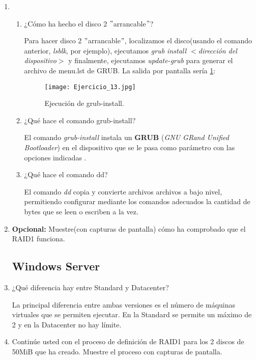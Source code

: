 \documentclass[paper=a4, fontsize=11pt]{scrartcl} %
\numberwithin{equation}{section} %
\numberwithin{figure}{section} %
\numberwithin{table}{section} %
\begin{document}
\begin{enumerate}
		
		\item \begin{enumerate}
			\item ¿Cómo ha hecho el disco 2 $"$arrancable$"$?
			
			Para hacer disco 2 $"$arrancable$"$, localizamos el disco(usando el comando anterior,
			\textit{lsblk}, por ejemplo), ejecutamos \textit{grub install $<$dirección del dispositivo$>$}
			y finalmente, ejecutamos \textit{update-grub} para generar el archivo de menu.lst de GRUB.
			La salida por pantalla sería \ref{fig:grub}:

			\begin{figure}[H]
				\centering
				\texttt{[image: Ejercicio\_13.jpg]}
				\caption{Ejecución de grub-install.} 	
				\label{fig:grub}
			\end{figure}

			\item ¿Qué hace el comando grub-install?
			
			El comando \textit{grub-install} instala un \textbf{GRUB} (\textit{GNU GRand Unified
			Bootloader}) en el dispositivo que se le pasa como parámetro con las opciones indicadas
			\cite{man_grub-install}.
			
			\item ¿Qué hace el comando dd?
			
			El comando \textit{dd} copia y convierte archivos archivos a bajo nivel, permitiendo configurar
			mediante los comandos adecuados la cantidad de bytes que se leen o escriben a la vez\cite{man_dd}.
			
		\end{enumerate}
		
		\item \textbf{Opcional:} Muestre(con capturas de pantalla) cómo ha comprobado que el RAID1
		funciona.
		
		
		
	\subsection{Windows Server}
		\item ¿Qué diferencia hay entre Standard y Datacenter?
		
		La principal diferencia entre ambas versiones es el número de máquinas virtuales que se
		permiten ejecutar. En la Standard se permite un máximo de 2 y en la Datacenter no hay
		límite.\cite{W12_v}

		\item Continúe usted con el proceso de definición de RAID1 para los 2 discos de 50MiB que
		ha creado. Muestre el proceso con capturas de pantalla.
		

\end{enumerate}
\end{document}
